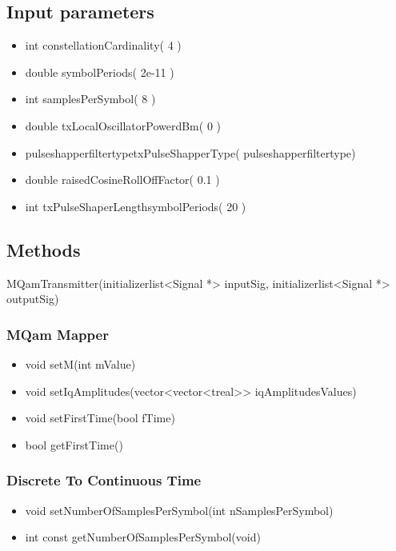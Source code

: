 \subsection*{Input parameters}

\begin{itemize}
    \item int constellationCardinality( 4 )
    \item double symbolPeriod\textunderscore s( 2e-11 )
    \item int samplesPerSymbol( 8 )
    \item double txLocalOscillatorPower\textunderscore dBm( 0 )
    \item pulse\textunderscore shapper\textunderscore filter\textunderscore typetxPulseShapperType( pulse\textunderscore shapper\textunderscore filter\textunderscore type)
    \item double raisedCosineRollOffFactor( 0.1 )
    \item int txPulseShaperLength\textunderscore symbolPeriods( 20 )
\end{itemize}
\subsection*{Methods}
MQamTransmitter(initializer\textunderscore list<Signal *> inputSig, initializer\textunderscore list<Signal *> outputSig)
\subsubsection{MQam Mapper}
\begin{itemize}

\item void setM(int mValue)
\item void setIqAmplitudes(vector<vector<t\textunderscore real>> iqAmplitudesValues)
\item void  setFirstTime(bool fTime)
\item bool getFirstTime()
\end{itemize}
\subsubsection{Discrete To Continuous Time}
\begin{itemize}
\item void setNumberOfSamplesPerSymbol(int nSamplesPerSymbol)
\item int const getNumberOfSamplesPerSymbol(void)
\end{itemize}
